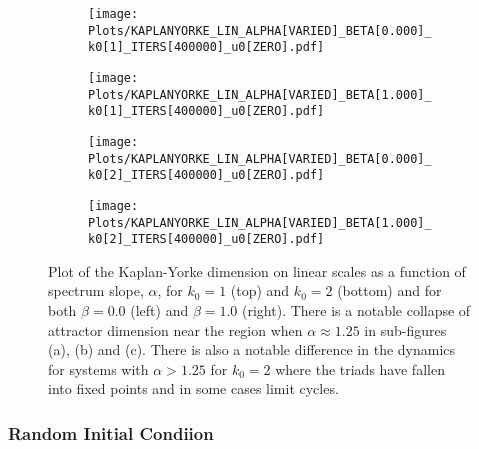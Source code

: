 \documentclass[9pt]{article}
\begin{document}
\begin{figure}[h!]
  \centering
  \begin{subfigure}[b]{0.49\linewidth}
    \texttt{[image: Plots/KAPLANYORKE\_LIN\_ALPHA[VARIED]\_BETA[0.000]\_k0[1]\_ITERS[400000]\_u0[ZERO].pdf]}
    \caption{}
  \end{subfigure}
  \begin{subfigure}[b]{0.49\linewidth}
    \texttt{[image: Plots/KAPLANYORKE\_LIN\_ALPHA[VARIED]\_BETA[1.000]\_k0[1]\_ITERS[400000]\_u0[ZERO].pdf]}
    \caption{}
  \end{subfigure}
  \begin{subfigure}[b]{0.49\linewidth}
    \texttt{[image: Plots/KAPLANYORKE\_LIN\_ALPHA[VARIED]\_BETA[0.000]\_k0[2]\_ITERS[400000]\_u0[ZERO].pdf]}
    \caption{}
  \end{subfigure}
   \begin{subfigure}[b]{0.49\linewidth}
    \texttt{[image: Plots/KAPLANYORKE\_LIN\_ALPHA[VARIED]\_BETA[1.000]\_k0[2]\_ITERS[400000]\_u0[ZERO].pdf]}
    \caption{}
  \end{subfigure}
  \caption{Plot of the Kaplan-Yorke dimension on linear scales as a function of spectrum slope, $\alpha$, for $k_0 = 1$ (top) and $k_0 = 2$ (bottom) and for both $\beta = 0.0$ (left) and $\beta = 1.0$ (right). There is a notable collapse of attractor dimension near the region when $\alpha \approx 1.25$ in sub-figures (a), (b) and (c). There is also a notable difference in the dynamics for systems with $\alpha > 1.25$ for $k_0 = 2$ where the triads have fallen into fixed points and in some cases limit cycles.}
  \label{fig:1_lin}
\end{figure}


\newpage

\subsubsection{Random Initial Condiion}
\end{document}
